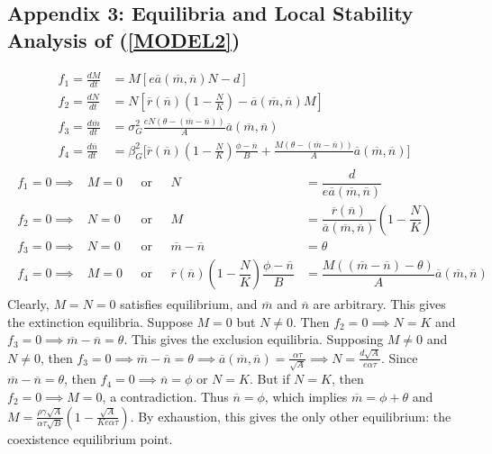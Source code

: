 \documentclass{amsart}
\theoremstyle{definition}
\theoremstyle{remark}
\numberwithin{equation}{section}
\begin{document}
\subsection{Appendix 3: Equilibria and Local Stability Analysis of (\ref{MODEL2})}
\begin{align*}
	f_1 = \frac{dM}{dt} &= M\left[e\overline{a}(\overline{m}, \overline{n})N - d\right] \\[5px]
	f_2 = \frac{dN}{dt} &= N\left[\overline{r}(\overline{n})\left(1 - \frac{N}{K}\right) - \overline{a}(\overline{m}, \overline{n})M\right] \\[5px]
	f_3 = \frac{d\overline{m}}{dt} &= \sigma_{G}^2\frac{eN(\theta - (\overline{m} - \overline{n}))}{A}\overline{a}(\overline{m}, \overline{n}) \\[5px]
	f_4 = \frac{d\overline{n}}{dt} &= \beta_{G}^2\Bigg[\overline{r}(\overline{n})\left(1 - \frac{N}{K}\right)\frac{\phi - \overline{n}}{B} + \frac{M(\theta - (\overline{m} - \overline{n}))}{A}\overline{a}(\overline{m}, \overline{n})\Bigg]
\end{align*}
\begin{align*}
	\begin{array}{cccrl}
		f_1 = 0 \implies& M = 0 \ \ \ &\text{or}&\ \ \ N &= \dfrac{d}{e\overline{a}(\overline{m}, \overline{n})} \\[10px]
		f_2 = 0 \implies& N = 0 \ \ \ &\text{or}&\ \ \ M &= \dfrac{\overline{r}(\overline{n})}{\overline{a}(\overline{m}, \overline{n})}\left(1 - \dfrac{N}{K}\right) \\[10px]
		f_3 = 0 \implies& N = 0 \ \ \ &\text{or}&\ \ \ \overline{m} - \overline{n} &= \theta \\[10px]
		f_4 = 0 \implies& M = 0 \ \ \ &\text{or}&\ \ \ \overline{r}(\overline{n})\left(1 - \dfrac{N}{K}\right)\dfrac{\phi - \overline{n}}{B} &= \dfrac{M((\overline{m} - \overline{n}) - \theta)}{A}\overline{a}(\overline{m}, \overline{n})
	\end{array}
\end{align*}
Clearly, $M = N = 0$ satisfies equilibrium, and $\overline{m}$ and $\overline{n}$ are arbitrary.  This gives the extinction equilibria.  Suppose $M = 0$ but $N \neq 0$.  Then $f_2 = 0 \implies N = K$ and $f_3 = 0 \implies \overline{m} - \overline{n} = \theta$.  This gives the exclusion equilibria.  Supposing $M \neq 0$ and $N \neq 0$, then $f_3 = 0 \implies \overline{m} - \overline{n} = \theta \implies \overline{a}(\overline{m}, \overline{n}) = \frac{\alpha\tau}{\sqrt{A}} \implies N = \frac{d\sqrt{A}}{e\alpha\tau}$.  Since $\overline{m} - \overline{n} = \theta$, then $f_4 = 0 \implies \overline{n} = \phi$ or $N = K$.  But if $N = K$, then $f_2 = 0 \implies M = 0$, a contradiction.  Thus $\overline{n} = \phi$, which implies $\overline{m} = \phi + \theta$ and $M = \frac{\rho\gamma\sqrt{A}}{\alpha\tau\sqrt{B}}\left(1 - \frac{\sqrt{A}}{Ke\alpha\tau}\right)$.  By exhaustion, this gives the only other equilibrium: the coexistence equilibrium point.
\end{document}
